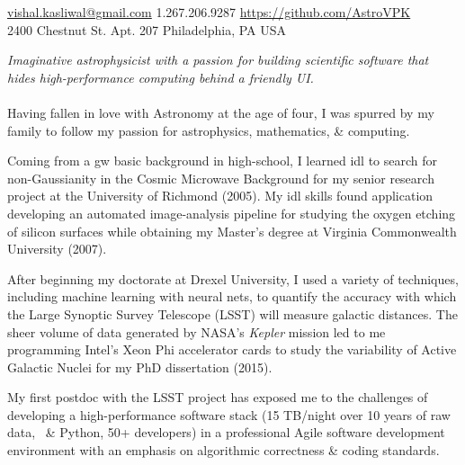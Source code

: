\documentclass[10pt,a4paper]{article}
\begin{document}
\sloppy  %



\nobreakvspace{0.3em}  %

\noindent\href{mailto:vishal.dot.kasliwal.at.gmail.dot.com}{vishal.kasliwal\mbox{}@\mbox{}gmail.com}\sbull
\textsmaller{+}1.267.206.9287\sbull
\href{https://github.com/AstroVPK}{https://github.com/AstroVPK}
\\
2400 Chestnut St.\sbull
\thinspace Apt. 207\sbull%
Philadelphia, PA\sbull
USA

\spacedhrule{0.9em}{-0.4em}  %


\vspace{-1.3em}  %
\begin{multicols}{2}  %
\noindent \emph{Imaginative astrophysicist with a passion for building scientific software that hides high-performance computing behind a friendly UI.}
\\
\\
Having fallen in love with Astronomy at the age of four, I was spurred by my family to follow my passion for astrophysics, mathematics, \& computing.

Coming from a {\large \sc gw basic} background in high-school, I learned {\large \sc idl} to search for non-Gaussianity in the Cosmic Microwave Background for my senior research project at the University of Richmond (2005). My {\large \sc idl} skills found application developing an automated image-analysis pipeline for studying the oxygen etching of silicon surfaces while obtaining my Master's degree at Virginia Commonwealth University (2007).

After beginning my doctorate at Drexel University, I used a variety of techniques, including machine learning with neural nets, to quantify the accuracy with which the Large Synoptic Survey Telescope (LSST) will measure galactic distances. The sheer volume of data generated by NASA's {\it Kepler} mission led to me programming Intel's Xeon Phi accelerator cards to study the variability of Active Galactic Nuclei for my PhD dissertation (2015).

My first postdoc with the LSST project has exposed me to the challenges of developing a high-performance software stack  (15 TB/night over 10 years of raw data, \CPP \ \& Python, 50+ developers) in a professional Agile software development environment with an emphasis on algorithmic correctness \& coding standards.
\end{multicols}
\end{document}
